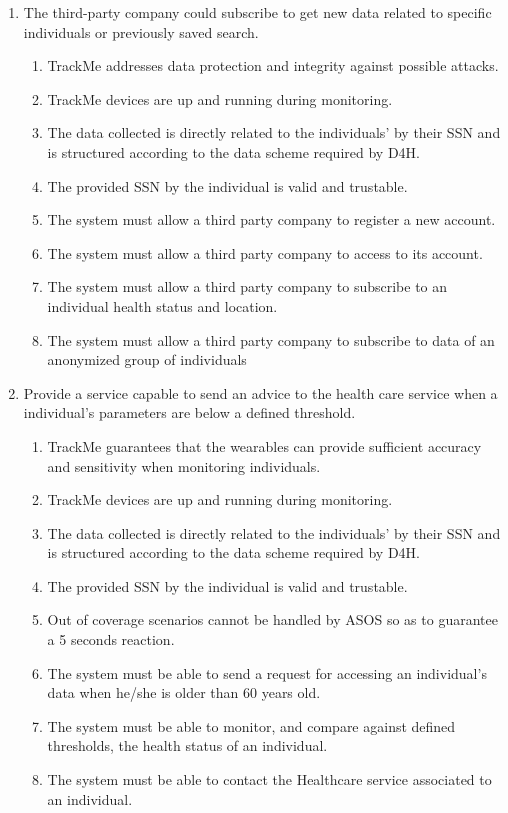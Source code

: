 \documentclass[hidelinks, 12pt]{report}
\newcommand\requirement[1]{\item[{[R#1]}] }
\newcommand\goal[1]{\item[{[G#1]}] }
\newcommand\assumption[1]{\item[{[D#1]}] }
\begin{document}
\begin{enumerate}
   \goal{4} The third-party company could subscribe to get new data related to specific individuals or previously saved search.
    \begin{enumerate}
      \assumption{2} TrackMe addresses data protection and integrity against possible attacks.
      \assumption{3} TrackMe devices are up and running during monitoring.
      \assumption{4} The data collected is directly related to the individuals' by their SSN and is structured according to the data scheme required by D4H.
      \assumption{5} The provided SSN by the individual is valid and trustable.
      \requirement{5} The system must allow a third party company to register a new account.
      \requirement{6} The system must allow a third party company to access to its account.
      \requirement{11} The system must allow a third party company to subscribe to an individual health status and location.
      \requirement{12} The system must allow a third party company to subscribe to data of an anonymized group of individuals
    \end{enumerate}

   \goal{5} Provide a service capable to send an advice to the health care service when a individual's parameters are below a defined threshold.
    \begin{enumerate}
      \assumption{1} TrackMe guarantees that the wearables can provide sufficient accuracy and sensitivity when monitoring individuals.
      \assumption{3} TrackMe devices are up and running during monitoring.
      \assumption{4} The data collected is directly related to the individuals' by their SSN and is structured according to the data scheme required by D4H.
      \assumption{5} The provided SSN by the individual is valid and trustable.
	  \assumption{6} Out of coverage scenarios cannot be handled by ASOS so as to guarantee a 5 seconds reaction.
      \requirement{13} The system must be able to send a request for accessing an individual's data when he/she is older than 60 years old.
      \requirement{14} The system must be able to monitor, and compare against defined thresholds, the health status of an individual.
      \requirement{15} The system must be able to contact the Healthcare service associated to an individual.
  \end{enumerate}


\end{enumerate}
\end{document}
